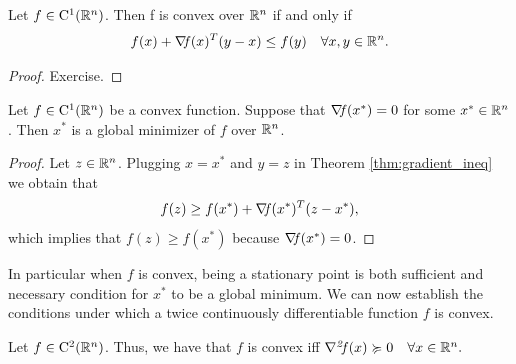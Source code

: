 \documentclass[10pt,a4paper]{article}
\begin{document}
\begin{theorem}\label{thm:gradient_ineq}
	Let $f\in \mathord{\mathrm{C^1}}(\mathbb{R}^n)$. Then f is convex over $\mathbb{R}^n$ if and only if
	\begin{equation}\label{eq:grad_ineq}
		f(x) +\operatorname*{\mathit{\nabla \!f}}(x)^T(y-x)\leq f(y) \quad \forall x, y\in \mathbb{R}^n.
	\end{equation}
\end{theorem}
\begin{proof}
	Exercise.
\end{proof}
\begin{proposition}\label{prop:stationarity}
	Let $f\in \mathord{\mathrm{C^1}}(\mathbb{R}^n)$ be a convex function. Suppose that $\operatorname*{\mathit{\nabla \!f}}(x^*)=0$ for some $x^*\in \mathbb{R}^n$. Then $x^*$ is a global minimizer of $f$ over $\mathbb{R}^n$.
\end{proposition}
\begin{proof}
	Let $z\in \mathbb{R}^n$. Plugging $x=x^*$ and $y=z$ in Theorem \ref{thm:gradient_ineq} we obtain that 
	\begin{equation*}
		f(z)\geq f(x^*) +\operatorname*{\mathit{\nabla \!f}}(x^*)^T(z-x^*),
	\end{equation*}
	which implies that $f(z)\geq f(x^*) $ because $\operatorname*{\mathit{\nabla \!f}}(x^*)=0$.
\end{proof}
In particular when $f$ is convex, being a stationary point is both sufficient and necessary condition for $x^*$ to be a global minimum.
We can now establish the conditions under which a twice continuously differentiable function $f$ is convex.
\begin{theorem}
	Let $f\in \mathord{\mathrm{C^2}}(\mathbb{R}^n)$. Thus, we have that $f$ is convex iff $\operatorname*{\mathit{\nabla^2 \!f}}(x)\succcurlyeq0\quad \forall x\in \mathbb{R}^n.$
\end{theorem}
\end{document}
